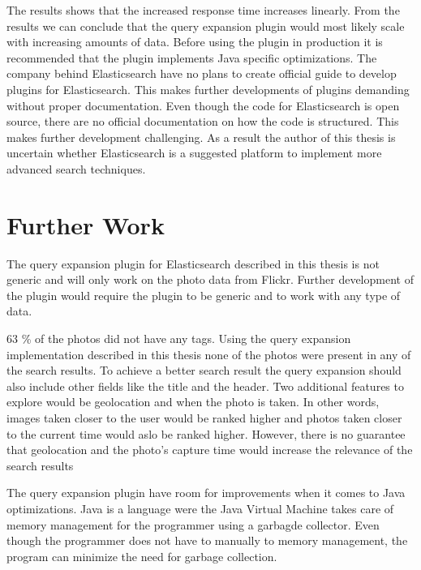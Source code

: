The results shows that the increased response time increases linearly.
From the results we can conclude that the query expansion plugin would most likely scale with increasing amounts of data.
Before using the plugin in production it is recommended that the plugin implements Java specific optimizations.
The company behind Elasticsearch have no plans to create official guide to develop plugins for Elasticsearch.
This makes further developments of plugins demanding without proper documentation.
Even though the code for Elasticsearch is open source,
there are no official documentation on how the code is structured.
This makes further development challenging.
As a result the author of this thesis is uncertain whether Elasticsearch is a suggested platform to implement more advanced search techniques.

\section{Further Work}
The query expansion plugin for Elasticsearch described in this thesis is not generic and will only work on the photo data from Flickr.
Further development of the plugin would require the plugin to be generic and to work with any type of data.

63 \% of the photos did not have any tags.
Using the query expansion implementation described in this thesis none of the photos were present in any of the search results.
To achieve a better search result the query expansion should also include other fields like the title and the header.
Two additional features to explore would be geolocation and when the photo is taken.
In other words,
images taken closer to the user would be ranked higher and photos taken closer to the current time would aslo be ranked higher.
However, there is no guarantee that geolocation and the photo's capture time would increase the relevance of the search results

The query expansion plugin have room for improvements when it comes to Java optimizations.
Java is a language were the Java Virtual Machine takes care of memory management for the programmer using a garbagde collector.
Even though the programmer does not have to manually to memory management,
the program can minimize the need for garbage collection.






\cleardoublepage
